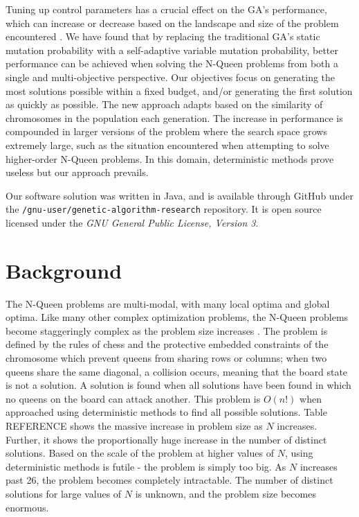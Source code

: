 \documentclass[conference]{IEEEtran}
\begin{document}
Tuning up control parameters has a crucial effect on the GA's performance, which can increase or decrease based on the landscape and size of the problem encountered \cite{ye2010some,coyne1994genetic,srinivas1994adaptive}. We have found that by replacing the traditional GA's static mutation probability with a self-adaptive variable mutation probability, better performance can be achieved when solving the N-Queen problems from both a single and multi-objective perspective. Our objectives focus on generating the most solutions possible within a fixed budget, and/or generating the first solution as quickly as possible. The new approach adapts based on the similarity of chromosomes in the population each generation. The increase in performance is compounded in larger versions of the problem where the search space grows extremely large, such as the situation encountered when attempting to solve higher-order N-Queen problems. In this domain, deterministic methods prove useless but our approach prevails.

Our software solution was written in Java, and is available through GitHub under the \texttt{/gnu-user/genetic-algorithm-research} repository. It is open source licensed under the \textit{GNU General Public License, Version 3}.

\section{Background}
The N-Queen problems are multi-modal, with many local optima and global optima. 
Like many other complex optimization problems, the N-Queen problems become staggeringly complex as the problem size increases \cite{homaifar1992queens}. The problem is defined by the rules of chess and the protective embedded constraints of the chromosome which prevent queens from sharing rows or columns; when two queens share the same diagonal, a collision occurs, meaning that the board state is not a solution. A solution is found when all solutions have been found in which no queens on the board can attack another. This problem is {$O(n!)$} when approached using deterministic methods to find all possible solutions. Table {REFERENCE} shows the massive increase in problem size as $N$ increases. Further, it shows the proportionally huge increase in the number of distinct solutions. Based on the scale of the problem at higher values of $N$, using deterministic methods is futile - the problem is simply too big. As $N$ increases past 26, the problem becomes completely intractable. The number of distinct solutions for large values of $N$ is unknown, and the problem size becomes enormous. 
\end{document}

